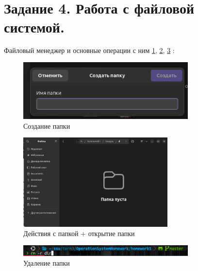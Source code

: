 \section{Задание 4. Работа с файловой системой.}

Файловый менеджер и основные операции с ним \ref{fig:createDir}, \ref{fig:useDir}, \ref{fig:delDir} :

\begin{figure}[!h]
    \centering
    \includegraphics[width = 0.8\textwidth]{images/createDir.png}
    
    \caption{Создание папки}
    
    \label{fig:createDir}
\end{figure}

\begin{figure}[!h]
    \centering
    \includegraphics[width = 0.7\textwidth]{images/useDir.png}
    
    \caption{Действия с папкой + открытие папки}
    
    \label{fig:useDir}
\end{figure}

\begin{figure}[!h]
    \centering
    \includegraphics[width = 0.8\textwidth]{images/delDir.png}
    
    \caption{Удаление папки}
    
    \label{fig:delDir}
\end{figure}

